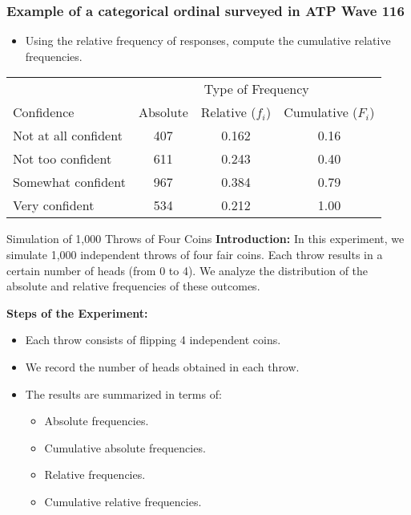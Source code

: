 \documentclass[handout]{beamer} %
\begin{document}
\begin{frame}
\frametitle{Example of a categorical ordinal surveyed in ATP Wave 116}
\begin{itemize}
\item Using the relative frequency of responses, compute the cumulative relative frequencies.
\end{itemize}

\medskip

{\small \centering
\begin{tabular}{|l|c|c|c|}
\hline
& \multicolumn{3}{c|}{Type of Frequency} \\ 
\cline{2-4}
Confidence & Absolute & Relative ($f_i$) & Cumulative ($F_i$)  \\
\hline
Not at all confident & 407 & 0.162 & 0.16 \\
Not too confident & 611 & 0.243 & 0.40 \\
Somewhat confident & 967 & 0.384 & 0.79 \\
Very confident & 534 & 0.212 & 1.00 \\
\hline
\end{tabular}
\par}

\end{frame}

\begin{frame}{Simulation of 1,000 Throws of Four Coins}
    \textbf{Introduction:} In this experiment, we simulate 1,000 independent throws of four fair coins. 
    Each throw results in a certain number of heads (from 0 to 4). We analyze the distribution of the 
    absolute and relative frequencies of these outcomes.
    
    \vspace{1em}
    
    \textbf{Steps of the Experiment:}
    \begin{itemize}
        \item Each throw consists of flipping 4 independent coins.
        \item We record the number of heads obtained in each throw.
        \item The results are summarized in terms of:
        \begin{itemize}
            \item Absolute frequencies.
            \item Cumulative absolute frequencies.
            \item Relative frequencies.
            \item Cumulative relative frequencies.
        \end{itemize}
    \end{itemize}
\end{frame}
\end{document}
